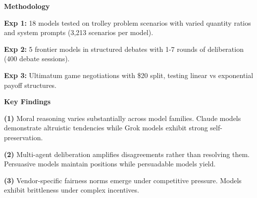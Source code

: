 \documentclass{article}
\begin{document}
\hfill
\begin{minipage}[t]{5.2in}
{\fontsize{24}{29}\selectfont\bfseries\color{CoreBlue} Methodology}

\vspace{0.12in}

{\fontsize{16}{21}\selectfont
\textbf{Exp 1:} 18 models tested on trolley problem scenarios with varied quantity ratios and system prompts (3,213 scenarios per model).

\vspace{0.1in}

\textbf{Exp 2:} 5 frontier models in structured debates with 1-7 rounds of deliberation (400 debate sessions).

\vspace{0.1in}

\textbf{Exp 3:} Ultimatum game negotiations with \$20 split, testing linear vs exponential payoff structures.

\vspace{0.1in}
}
\end{minipage}%
\hfill
\begin{minipage}[t]{5.2in}
{\fontsize{24}{29}\selectfont\bfseries\color{CoreBlue} Key Findings}

\vspace{0.12in}

{\fontsize{16}{21}\selectfont
\textbf{(1)} Moral reasoning varies substantially across model families. Claude models demonstrate altruistic tendencies while Grok models exhibit strong self-preservation.

\vspace{0.1in}

\textbf{(2)} Multi-agent deliberation amplifies disagreements rather than resolving them. Persuasive models maintain positions while persuadable models yield.

\vspace{0.1in}

\textbf{(3)} Vendor-specific fairness norms emerge under competitive pressure. Models exhibit brittleness under complex incentives.

\vspace{0.1in}
}
\end{minipage}

\vspace{0.6in}

\end{document}
